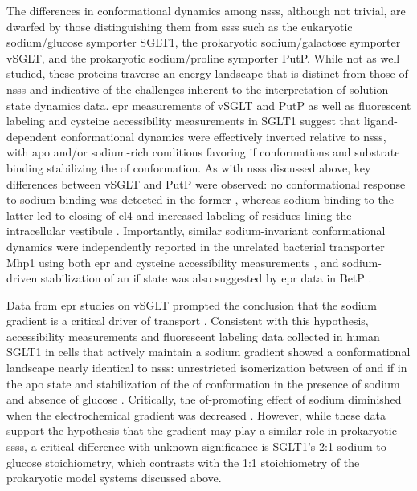 The differences in conformational dynamics among \gls{nss}s, although not trivial, are dwarfed by those distinguishing them from \gls{sss}s such as the eukaryotic sodium/glucose symporter SGLT1, the prokaryotic sodium/galactose symporter vSGLT, and the prokaryotic sodium/proline symporter PutP. While not as well studied, these proteins traverse an energy landscape that is distinct from those of \gls{nss}s and indicative of the challenges inherent to the interpretation of solution-state dynamics data. \Gls{epr} measurements of vSGLT \citep*{Paz2018} and PutP \citep*{Raba2014} as well as fluorescent labeling and cysteine accessibility measurements in SGLT1 \citep*{Loo1998, Loo2006, SalaRabanal2012} suggest that ligand-dependent conformational dynamics were effectively inverted relative to \gls{nss}s, with apo and/or sodium-rich conditions favoring \gls{if} conformations and substrate binding stabilizing the \gls{of} conformation. As with \gls{nss}s discussed above, key differences between vSGLT and PutP were observed: no conformational response to sodium binding was detected in the former \citep*{Paz2018}, whereas sodium binding to the latter led to closing of \gls{el}4 and increased labeling of residues lining the intracellular vestibule \citep*{Jeschke2004a, Raba2014, Wegener2000}. Importantly, similar sodium-invariant conformational dynamics were independently reported in the unrelated bacterial transporter Mhp1 using both \gls{epr} and cysteine accessibility measurements \citep*{Kazmier2014, Calabrese2017, Weyand2011}, and sodium-driven stabilization of an \gls{if} state was also suggested by \gls{epr} data in BetP \citep*{Leone2019}.

Data from \gls{epr} studies on vSGLT prompted the conclusion that the sodium gradient is a critical driver of transport \citep*{Paz2018}. Consistent with this hypothesis, accessibility measurements and fluorescent labeling data collected in human SGLT1 in cells that actively maintain a sodium gradient showed a conformational landscape nearly identical to \gls{nss}s: unrestricted isomerization between \gls{of} and \gls{if} in the apo state \citep*{SalaRabanal2012} and stabilization of the \gls{of} conformation in the presence of sodium and absence of glucose \citep*{Loo1998, Meinild2002}. Critically, the \gls{of}-promoting effect of sodium diminished when the electrochemical gradient was decreased \citep*{Loo1998}. However, while these data support the hypothesis that the gradient may play a similar role in prokaryotic \gls{sss}s, a critical difference with unknown significance is SGLT1’s 2:1 sodium-to-glucose stoichiometry, which contrasts with the 1:1 stoichiometry of the prokaryotic model systems discussed above. 

